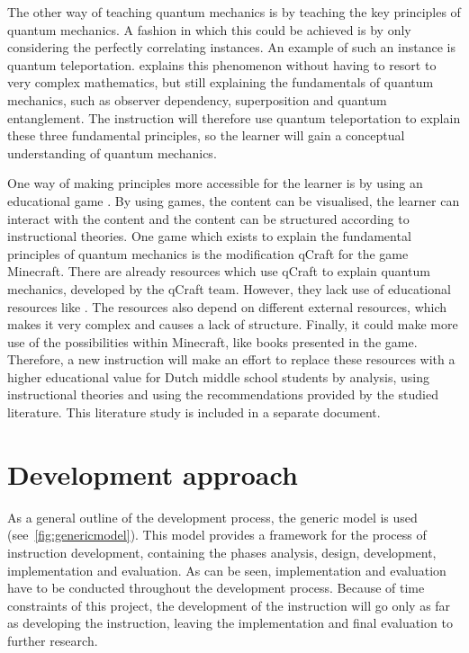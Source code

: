 \documentclass[11pt,twoside]{report} %
\begin{document}
The other way of teaching quantum mechanics is by teaching the key principles of quantum mechanics. A fashion in which this could be achieved is by only considering the perfectly correlating instances. An example of such an instance is quantum teleportation.  explains this phenomenon without having to resort to very complex mathematics, but still explaining the fundamentals of quantum mechanics, such as observer dependency, superposition and quantum entanglement. The instruction will therefore use quantum teleportation to explain these three fundamental principles, so the learner will gain a conceptual understanding of quantum mechanics.

One way of making principles more accessible for the learner is by using an educational game \cite{wouters}. By using games, the content can be visualised, the learner can interact with the content and the content can be structured according to instructional theories. One game which exists to explain the fundamental principles of quantum mechanics is the modification qCraft for the game Minecraft. There are already resources which use qCraft to explain quantum mechanics, developed by the qCraft team. However, they lack use of educational resources like . The resources also depend on different external resources, which makes it very complex and causes a lack of structure. Finally, it could make more use of the possibilities within Minecraft, like books presented in the game. Therefore, a new instruction will make an effort to replace these resources with a higher educational value for Dutch middle school students by analysis, using instructional theories and using the recommendations provided by the studied literature. This literature study is included in a separate document.

\chapter{Development approach}

As a general outline of the development process, the generic model is used \cite{genericmodel} (see~\ref{fig:genericmodel}). This model provides a framework for the process of instruction development, containing the phases analysis, design, development, implementation and evaluation. As can be seen, implementation and evaluation have to be conducted throughout the development process. Because of time constraints of this project, the development of the instruction will go only as far as developing the instruction, leaving the implementation and final evaluation to further research.
\end{document}
